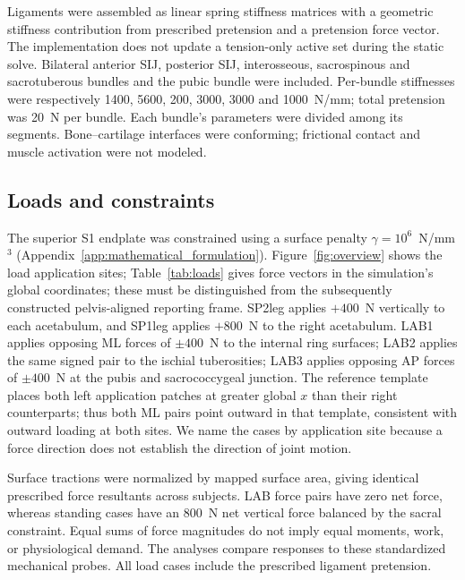 Ligaments were assembled as linear spring stiffness matrices with a geometric stiffness contribution from prescribed pretension and a pretension force vector. The implementation does not update a tension-only active set during the static solve. Bilateral anterior SIJ, posterior SIJ, interosseous, sacrospinous and sacrotuberous bundles and the pubic bundle were included. Per-bundle stiffnesses were respectively 1400, 5600, 200, 3000, 3000 and 1000~N/mm; total pretension was 20~N per bundle. Each bundle's parameters were divided among its segments. Bone--cartilage interfaces were conforming; frictional contact and muscle activation were not modeled.

\subsection{Loads and constraints}
The superior S1 endplate was constrained using a surface penalty $\gamma=10^6$~N/mm$^3$ (Appendix~\ref{app:mathematical_formulation}). Figure~\ref{fig:overview} shows the load application sites; Table~\ref{tab:loads} gives force vectors in the simulation's global coordinates; these must be distinguished from the subsequently constructed pelvis-aligned reporting frame. SP2leg applies $+400$~N vertically to each acetabulum, and SP1leg applies $+800$~N to the right acetabulum. LAB1 applies opposing ML forces of $\pm400$~N to the internal ring surfaces; LAB2 applies the same signed pair to the ischial tuberosities; LAB3 applies opposing AP forces of $\pm400$~N at the pubis and sacrococcygeal junction. The reference template places both left application patches at greater global $x$ than their right counterparts; thus both ML pairs point outward in that template, consistent with outward loading at both sites. We name the cases by application site because a force direction does not establish the direction of joint motion.

Surface tractions were normalized by mapped surface area, giving identical prescribed force resultants across subjects. LAB force pairs have zero net force, whereas standing cases have an 800~N net vertical force balanced by the sacral constraint. Equal sums of force magnitudes do not imply equal moments, work, or physiological demand. The analyses compare responses to these standardized mechanical probes. All load cases include the prescribed ligament pretension.
\begin{table}[htbp]
\centering
\caption{Standardized loads in global simulation coordinates. LAB1--LAB3 are independent mechanical proxies.}
\label{tab:loads}
\end{table}


